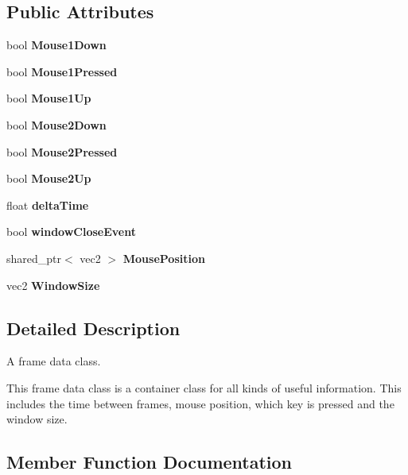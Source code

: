\subsection*{Public Attributes}
\begin{DoxyCompactItemize}
\item 
\mbox{\label{class_frame_data_a128aaa3d69ea2d932ddbb866509ae274}} 
bool {\bfseries Mouse1\+Down}
\item 
\mbox{\label{class_frame_data_aaf6de7124342a446876536fa74b11645}} 
bool {\bfseries Mouse1\+Pressed}
\item 
\mbox{\label{class_frame_data_a150c4385c82a747e6cd346d90a413704}} 
bool {\bfseries Mouse1\+Up}
\item 
\mbox{\label{class_frame_data_a506c530b89f23ea7e8083142a42e2f3d}} 
bool {\bfseries Mouse2\+Down}
\item 
\mbox{\label{class_frame_data_ae5aaea893ae4e3801a92789ec12e87c2}} 
bool {\bfseries Mouse2\+Pressed}
\item 
\mbox{\label{class_frame_data_a2c558be97d10eade9faf3ec6c8c0e4c9}} 
bool {\bfseries Mouse2\+Up}
\item 
\mbox{\label{class_frame_data_a3835c23375daaee0c92095e8d320faec}} 
float {\bfseries delta\+Time}
\item 
\mbox{\label{class_frame_data_a5045812ad5d3887919017838c0423859}} 
bool {\bfseries window\+Close\+Event}
\item 
\mbox{\label{class_frame_data_a8e0be8990b4bed347949f3668e6b9737}} 
shared\+\_\+ptr$<$ vec2 $>$ {\bfseries Mouse\+Position}
\item 
\mbox{\label{class_frame_data_aede342bba42d1977db391f939c394483}} 
vec2 {\bfseries Window\+Size}
\end{DoxyCompactItemize}


\subsection{Detailed Description}
A frame data class. 

This frame data class is a container class for all kinds of useful information. This includes the time between frames, mouse position, which key is pressed and the window size. 

\subsection{Member Function Documentation}
\mbox{\label{class_frame_data_a6e128b66488d6172a463a136ec51722c}} 
